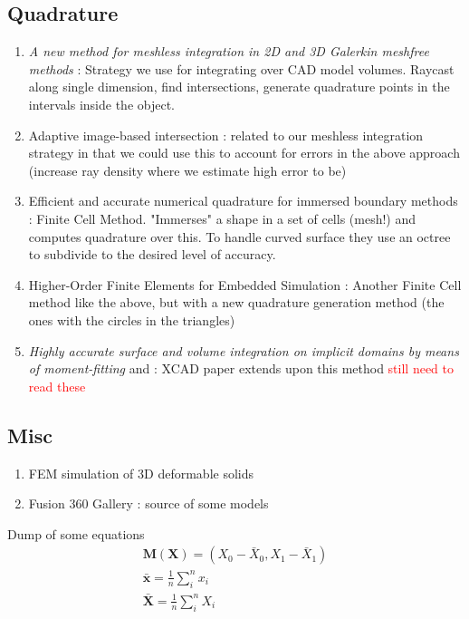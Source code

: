 \documentclass[sigconf]{acmart}
\newcommand\myworries[1]{\textcolor{red}{#1}}
\begin{document}
\subsection{Quadrature}
\begin{enumerate}
    \item \textit{A new method for meshless integration in 2D and 3D Galerkin meshfree methods} \cite{KHOSRAVIFARD201030}: Strategy we use for integrating over CAD model volumes. Raycast along single dimension, find intersections, generate quadrature points in the intervals inside the object.
    \item Adaptive image-based intersection \cite{DBLP:journals/tog/WangFP12}: related to our meshless integration strategy in that we could use this to account for errors in the above approach (increase ray density where we estimate high error to be)
    \item Efficient and accurate numerical quadrature for immersed boundary methods \cite{10.1186/s40323-015-0031-y}: Finite Cell Method. "Immerses" a shape in a set of cells (mesh!) and computes quadrature over this. To handle curved surface they use an octree to subdivide to the desired level of accuracy.
    \item Higher-Order Finite Elements for Embedded Simulation \cite{10.1145/3414685.3417853}: Another Finite Cell method like the above, but with a new quadrature generation method (the ones with the circles in the triangles)
    \item \textit{Highly accurate surface and volume integration on implicit domains by means of moment-fitting} \cite{https://doi.org/10.1002/nme.4569} and \cite{https://doi.org/10.1002/nme.5343}: XCAD paper extends upon this method \myworries{still need to read these}
\end{enumerate}

\subsection{Misc}
\begin{enumerate}
    \item FEM simulation of 3D deformable solids \cite{10.1145/2343483.2343501}
    \item Fusion 360 Gallery \cite{willis2020fusion} : source of some models
\end{enumerate}





Dump of some equations
\begin{align*}
    \mathbf{M(X)} = (X_0 - \bar{X}_0, X_1 - \bar{X}_1)\\
    \bar{\mathbf{x}} = \frac{1}{n}\sum_i^n x_i \\
    \bar{\mathbf{X}} = \frac{1}{n}\sum_i^n X_i \\
\end{align*}
\end{document}
